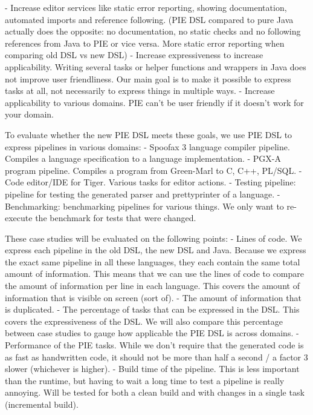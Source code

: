 - Increase editor services like static error reporting, showing documentation, automated imports and reference following. (PIE DSL compared to pure Java actually does the opposite: no documentation, no static checks and no following references from Java to PIE or vice versa. More static error reporting when comparing old DSL vs new DSL)
- Increase expressiveness to increase applicability. Writing several tasks or helper functions and wrappers in Java does not improve user friendliness.
Our main goal is to make it possible to express tasks at all, not necessarily to express things in multiple ways.
- Increase applicability to various domains. PIE can't be user friendly if it doesn't work for your domain.

To evaluate whether the new PIE DSL meets these goals, we use PIE DSL to express pipelines in various domains:
- Spoofax 3 language compiler pipeline. Compiles a language specification to a language implementation.
- PGX-A program pipeline. Compiles a program from Green-Marl to C, C++, PL/SQL.
- Code editor/IDE for Tiger. Various tasks for editor actions.
- Testing pipeline: pipeline for testing the generated parser and prettyprinter of a language.
- Benchmarking: benchmarking pipelines for various things. We only want to re-execute the benchmark for tests that were changed.

These case studies will be evaluated on the following points:
- Lines of code. We express each pipeline in the old DSL, the new DSL and Java. Because we express the exact same pipeline in all these languages, they each contain the same total amount of information. This means that we can use the lines of code to compare the amount of information per line in each language. This covers the amount of information that is visible on screen (sort of).
- The amount of information that is duplicated. \todo
- The percentage of tasks that can be expressed in the DSL.
This covers the expressiveness of the DSL. We will also compare this percentage between case studies to gauge how applicable the PIE DSL is across domains.
- Performance of the PIE tasks.
While we don't require that the generated code is as fast as handwritten code, it should not be more than half a second / a factor 3 slower (whichever is higher).
- Build time of the pipeline.
This is less important than the runtime, but having to wait a long time to test a pipeline is really annoying. Will be tested for both a clean build and with changes in a single task (incremental build).

